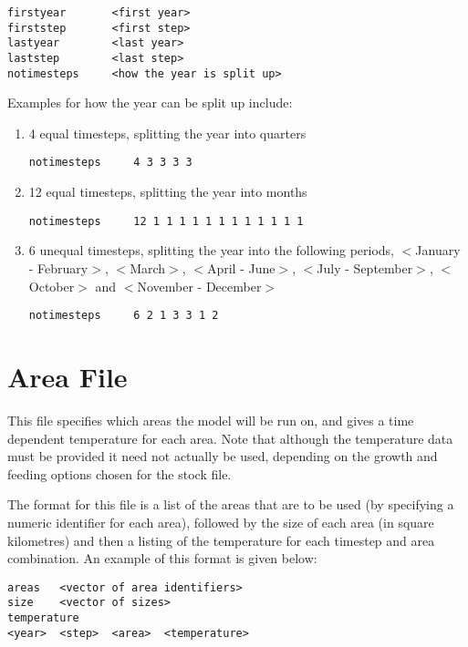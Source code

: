 \documentclass[]{book}
\begin{document}
\begin{verbatim}
firstyear       <first year>
firststep       <first step>
lastyear        <last year>
laststep        <last step>
notimesteps     <how the year is split up>
\end{verbatim}

Examples for how the year can be split up include:

\begin{enumerate}
\def\labelenumi{\arabic{enumi}.}
\item
  4 equal timesteps, splitting the year into quarters

\begin{verbatim}
notimesteps     4 3 3 3 3
\end{verbatim}
\item
  12 equal timesteps, splitting the year into months

\begin{verbatim}
notimesteps     12 1 1 1 1 1 1 1 1 1 1 1 1
\end{verbatim}
\item
  6 unequal timesteps, splitting the year into the following periods,
  \(<\)January - February\(>\), \(<\)March\(>\), \(<\)April - June\(>\), \(<\)July -
  September\(>\), \(<\)October\(>\) and \(<\)November - December\(>\)

\begin{verbatim}
notimesteps     6 2 1 3 3 1 2
\end{verbatim}
\end{enumerate}

\hypertarget{sec:areafile}{%
\section{Area File}\label{sec:areafile}}

This file specifies which areas the model will be run on, and gives a
time dependent temperature for each area. Note that although the
temperature data must be provided it need not actually be used,
depending on the growth and feeding options chosen for the stock file.

The format for this file is a list of the areas that are to be used (by
specifying a numeric identifier for each area), followed by the size of
each area (in square kilometres) and then a listing of the temperature
for each timestep and area combination. An example of this format is
given below:

\begin{verbatim}
areas   <vector of area identifiers>
size    <vector of sizes>
temperature
<year>  <step>  <area>  <temperature>
\end{verbatim}
\end{document}
